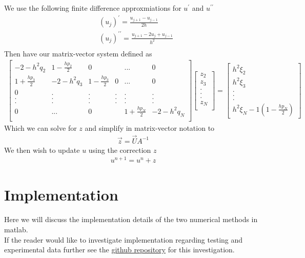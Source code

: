 \documentclass{article}
\begin{document}
\begin{enumerate}
We use the following finite difference approxmiations for $u^\prime$ and $u^{\prime\prime}$
\begin{align}
&(u_j)^\prime = \frac{u_{j+1} - u_{j-1}}{2h} \\
&(u_j)^{\prime\prime} = \frac{u_{j+1} - 2u_{j} + u_{j-1}}{h^2} \\
\end{align}
Then have our matrix-vector system defined as
\begin{align}
\begin{bmatrix}
-2 - h^2q_2 & 1- \frac{hp_2}{2} & 0 & &... & 0 \\
1 + \frac{hp_3}{2} & -2 - h^2q_3 & 1 - \frac{hp_3}{2} & 0 &...& 0\\
0 & . & . & . & . & .\\
. & . & . & . & . & .\\
. & . & . & . & . & .\\
0 & ... &0 & & 1 + \frac{hp_N}{2} & -2 - h^2q_N \\
\end{bmatrix}
\begin{bmatrix}
z_2 \\ z_3 \\ . \\ . \\ . \\ z_N\\
\end{bmatrix}
=
\begin{bmatrix}
h^2 \xi_2 \\
h^2 \xi_3 \\
. \\
. \\
. \\
h^2 \xi_N - 1(1-\frac{hp_N}{2})
\end{bmatrix}
\end{align}
Which we can solve for $z$ and simplify in matrix-vector notation to
\begin{align}
\vec{z} = \vec{U} A^{-1} 
\end{align}
We then wish to update $u$ using the correction $z$
\begin{align}
u^{n + 1} = u^{n} + z
\end{align}
\end{enumerate}
\section{Implementation}
Here we will discuss the implementation details of the two numerical methods in matlab. \\
If the reader would like to investigate implementation regarding testing and experimental data further see the \href{https://github.com/Liam-Watson/3AN-Vortex-Solutions}{ github repository} for this investigation.
\end{document}
